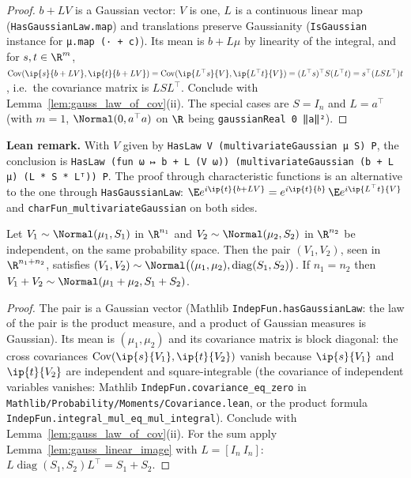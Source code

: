 \begin{proof}
$b + LV$ is a Gaussian vector: $V$ is one, $L$ is a continuous linear map
(\texttt{HasGaussianLaw.map}) and translations preserve Gaussianity
(\texttt{IsGaussian} instance for \texttt{μ.map (· + c)}). Its mean is $b + L\mu$ by
linearity of the integral, and for $s, t \in \R^m$,
$\operatorname{Cov}(\ip{s}{b + LV}, \ip{t}{b+LV}) = \operatorname{Cov}(\ip{L^\top s}{V},
\ip{L^\top t}{V}) = (L^\top s)^\top S (L^\top t) = s^\top (LSL^\top) t$, i.e.\ the covariance
matrix is $LSL^\top$. Conclude with Lemma~\ref{lem:gauss_law_of_cov}(ii). The special cases
are $S = I_n$ and $L = a^\top$ (with $m = 1$, $\Normal(0, a^\top a)$ on $\R$ being
\texttt{gaussianReal 0 ‖a‖²}).
\end{proof}

\textbf{Lean remark.} With $V$ given by \texttt{HasLaw V (multivariateGaussian μ S) P}, the
conclusion is \texttt{HasLaw (fun ω ↦ b + L (V ω)) (multivariateGaussian (b + L μ) (L * S * Lᵀ)) P}.
The proof through characteristic functions is an alternative to the one through
\texttt{HasGaussianLaw}: $\E e^{i\ip{t}{b + LV}} = e^{i\ip{t}{b}}\,\E e^{i\ip{L^\top t}{V}}$
and \texttt{charFun\_multivariateGaussian} on both sides.

\begin{lemma}\label{lem:pg_indep_gaussian_pair}
Let $V_1 \sim \Normal(\mu_1, S_1)$ in $\R^{n_1}$ and $V_2 \sim \Normal(\mu_2, S_2)$ in
$\R^{n_2}$ be independent, on the same probability space. Then the pair $(V_1, V_2)$, seen in
$\R^{n_1 + n_2}$, satisfies
$(V_1,V_2) \sim \Normal\big((\mu_1,\mu_2), \operatorname{diag}(S_1, S_2)\big)$.
If $n_1 = n_2$ then $V_1 + V_2 \sim \Normal(\mu_1 + \mu_2, S_1 + S_2)$.
\end{lemma}

\begin{proof}
The pair is a Gaussian vector (Mathlib \texttt{IndepFun.hasGaussianLaw}: the law of the pair
is the product measure, and a product of Gaussian measures is Gaussian). Its mean is
$(\mu_1,\mu_2)$ and its covariance matrix is block diagonal: the cross covariances
$\operatorname{Cov}(\ip{s}{V_1}, \ip{t}{V_2})$ vanish because $\ip{s}{V_1}$ and $\ip{t}{V_2}$
are independent and square-integrable (the covariance of independent variables vanishes:
Mathlib \texttt{IndepFun.covariance\_eq\_zero} in \texttt{Mathlib/Probability/Moments/Covariance.lean},
or the product formula \texttt{IndepFun.integral\_mul\_eq\_mul\_integral}). Conclude with
Lemma~\ref{lem:gauss_law_of_cov}(ii). For the sum apply Lemma~\ref{lem:gauss_linear_image}
with $L = [I_n\ I_n]$: $L\operatorname{diag}(S_1,S_2)L^\top = S_1 + S_2$.
\end{proof}

